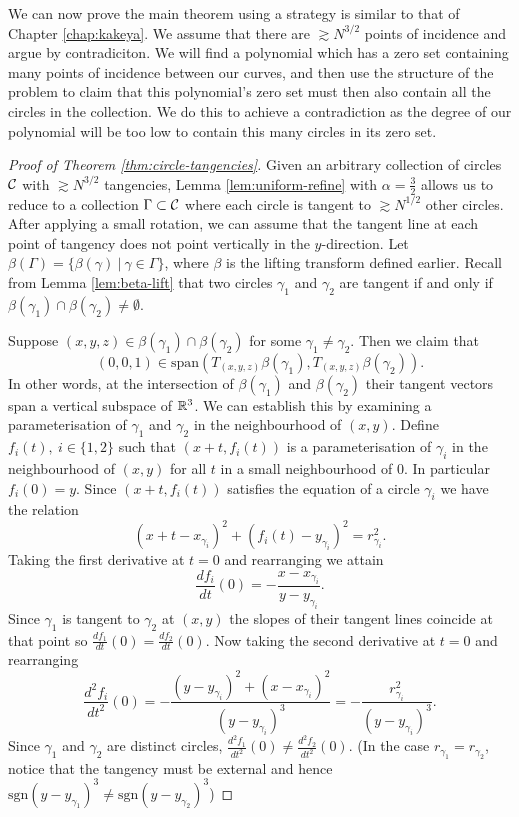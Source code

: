 We can now prove the main theorem using a strategy is similar to that of Chapter \ref*{chap:kakeya}. We assume that there are $\gtrsim N^{3/2}$ points of incidence and argue by contradiciton.
We will find a polynomial which has a zero set containing
many points of incidence between our curves, and then use the structure of the problem to claim that this polynomial's zero set must then also contain all the circles in the collection.
We do this to achieve a contradiction as the degree of our polynomial will be too low to contain this many circles in its zero set.
\begin{proof}[Proof of Theorem \ref{thm:circle-tangencies}]
    Given an arbitrary collection of circles $\mathcal C$ with $\gtrsim N^{3/2}$ tangencies, Lemma \ref{lem:uniform-refine} with $\alpha = \frac{3}{2}$ 
    allows us to reduce to a collection
     $\Gamma \subset \mathcal C$ where each circle is tangent to  $\gtrsim N^{1/2}$ other circles. 
    After applying a small rotation, we can assume that the tangent line at each point of tangency does not point vertically in the $y$-direction.
    Let $\beta (\Gamma) = \{ \beta(\gamma) \ | \ \gamma \in \Gamma \}$, where $\beta$ is the lifting transform defined earlier.
    Recall from Lemma \ref{lem:beta-lift} that two circles $\gamma_1$ and $\gamma_2$ are tangent if and only if $\beta(\gamma_1) \cap \beta(\gamma_2) \neq \emptyset$.

    Suppose $(x,y,z) \in \beta(\gamma_1) \cap \beta(\gamma_2) $ for some $\gamma_1 \neq \gamma_2$. 
    Then we claim that $$(0,0,1) \in \text{span} \left( T_{(x,y,z) }\beta (\gamma_1), T_{(x,y,z) }\beta (\gamma_2)\right).$$
    In other words, at the intersection of $\beta(\gamma_1)$ and $\beta(\gamma_2)$ their tangent vectors span a vertical subspace of $\mathbb R^3$. 
    We can establish this by examining a parameterisation of $\gamma_1$ and $\gamma_2$ in the neighbourhood of $(x,y)$.
    Define $f_i (t), \ i \in \{1,2\}$ such that $(x+t, f_i(t))$ is a parameterisation of $\gamma_i$ in the neighbourhood of $(x,y)$ for all $t$ in a small neighbourhood of 0. In particular $f_i(0) = y$. Since $(x+t, f_i(t))$ satisfies the equation of a circle $\gamma_i$ we have the relation 
    \[
        (x+t - x_{\gamma_i})^2 +  (f_i(t) - y_{\gamma_i})^2 = r_{\gamma_i}^2.
    \]
    Taking the first derivative at $t=0$ and rearranging we attain
    \[
        \frac{df_i}{dt}(0) = -\frac{x- x_{\gamma_i}}{y- y_{\gamma_i}}.
    \]
    Since $\gamma_1$ is tangent to $\gamma_2$ at $(x,y)$ the slopes of their tangent lines coincide at that point so $\frac{df_1}{dt}(0) = \frac{df_2}{dt}(0)$. Now taking the second derivative at $t=0$ and rearranging
    \[
        \frac{d^2f_i}{dt^2}(0) = -\frac{(y- y_{\gamma_i})^2 + (x- x_{\gamma_i})^2}{(y- y_{\gamma_i})^3} = -\frac{r^2_{\gamma_i}}{(y- y_{\gamma_i})^3} .
    \]
    Since $\gamma_1$ and $\gamma_2$ are distinct circles, $\frac{d^2f_1}{dt^2}(0) \neq \frac{d^2f_2}{dt^2}(0)$. (In the case $r_{\gamma_1} = r_{\gamma_2}$, notice that the tangency must be external and hence $\text{sgn}(y-y_{\gamma_1})^3\neq \text{sgn}(y-y_{\gamma_2})^3$)




\end{proof}

